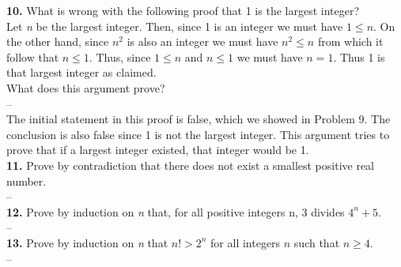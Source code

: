 \documentclass[paper=letter, fontsize=11pt]{scrartcl} %
\begin{document}
\textbf{10.} What is wrong with the following proof that 1 is the largest integer? \\

Let \textit{n} be the largest integer. Then, since 1 is an integer we must have $1 \le n$. On the other hand, since $n^2$ is also an integer we must have $n^2 \le n$ from which it follow that $n \le 1$. Thus, since $1 \le n$ and $n \le 1$ we must have $n = 1$. Thus 1 is that largest integer as claimed.
\\

What does this argument prove?
\\
--\\
The initial statement in this proof is false, which we showed in Problem 9. The conclusion is also false since 1 is not the largest integer. This argument tries to prove that if a largest integer existed, that integer would be 1.\\

\textbf{11.} Prove by contradiction that there does not exist a smallest positive real number.
\\
--\\

\textbf{12.} Prove by induction on \textit{n} that, for all positive integers n, 3 divides $4^n + 5$.
\\
--\\

\textbf{13.} Prove by induction on \textit{n} that $n! > 2^n$ for all integers $n$ such that $n \ge 4$.
\\
--\\
\end{document}

